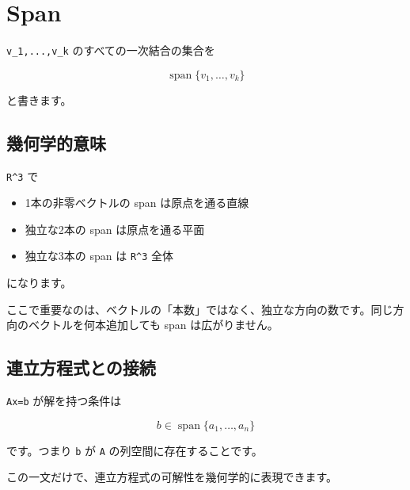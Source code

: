 \documentclass[
  11pt,
  a4paper,
]{ltjsarticle}
\author{}
\date{}
\providecommand{\tightlist}{%
  \setlength{\itemsep}{0pt}\setlength{\parskip}{0pt}}
\begin{document}
\hypertarget{span}{%
\section{Span}\label{span}}

\texttt{v\_1,...,v\_k} のすべての一次結合の集合を

\[
\operatorname{span}\{v_1,\dots,v_k\}
\]

と書きます。

\hypertarget{ux5e7eux4f55ux5b66ux7684ux610fux5473}{%
\subsection{幾何学的意味}\label{ux5e7eux4f55ux5b66ux7684ux610fux5473}}

\texttt{R\^{}3} で

\begin{itemize}
\tightlist
\item
  1本の非零ベクトルの span は原点を通る直線
\item
  独立な2本の span は原点を通る平面
\item
  独立な3本の span は \texttt{R\^{}3} 全体
\end{itemize}

になります。

ここで重要なのは、ベクトルの「本数」ではなく、独立な方向の数です。同じ方向のベクトルを何本追加しても
span は広がりません。

\hypertarget{ux9023ux7acbux65b9ux7a0bux5f0fux3068ux306eux63a5ux7d9a}{%
\subsection{連立方程式との接続}\label{ux9023ux7acbux65b9ux7a0bux5f0fux3068ux306eux63a5ux7d9a}}

\texttt{Ax=b} が解を持つ条件は

\[
b\in\operatorname{span}\{a_1,\dots,a_n\}
\]

です。つまり \texttt{b} が \texttt{A} の列空間に存在することです。

この一文だけで、連立方程式の可解性を幾何学的に表現できます。
\end{document}
